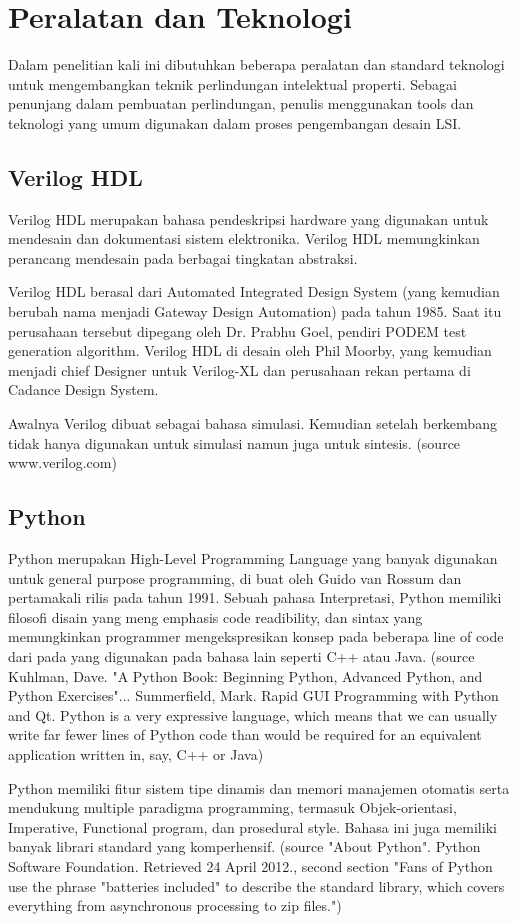 \section{Peralatan dan Teknologi}
Dalam penelitian kali ini dibutuhkan beberapa peralatan dan standard teknologi untuk mengembangkan teknik perlindungan intelektual properti. Sebagai penunjang dalam pembuatan perlindungan, penulis menggunakan tools dan teknologi yang umum digunakan dalam proses pengembangan desain LSI.

\subsection{Verilog HDL}
Verilog HDL merupakan bahasa pendeskripsi hardware yang digunakan untuk mendesain dan dokumentasi sistem elektronika. Verilog HDL memungkinkan perancang mendesain pada berbagai tingkatan abstraksi.

Verilog HDL berasal dari Automated Integrated Design System (yang kemudian berubah nama menjadi Gateway Design Automation) pada tahun 1985. Saat itu perusahaan tersebut dipegang oleh Dr. Prabhu Goel, pendiri PODEM test generation algorithm. Verilog HDL di desain oleh Phil Moorby, yang kemudian menjadi chief Designer untuk Verilog-XL dan perusahaan rekan pertama di Cadance Design System. 

Awalnya Verilog dibuat sebagai bahasa simulasi. Kemudian setelah berkembang tidak hanya digunakan untuk simulasi namun juga untuk sintesis. (source www.verilog.com)

\subsection{Python}
Python merupakan High-Level Programming Language yang banyak digunakan untuk general purpose programming, di buat oleh Guido van Rossum dan pertamakali rilis pada tahun 1991. Sebuah pahasa Interpretasi, Python memiliki filosofi disain yang meng emphasis code readibility, dan sintax yang memungkinkan programmer mengekspresikan konsep pada beberapa line of code dari pada yang digunakan pada bahasa lain seperti C++ atau Java. (source Kuhlman, Dave. "A Python Book: Beginning Python, Advanced Python, and Python Exercises"... Summerfield, Mark. Rapid GUI Programming with Python and Qt. Python is a very expressive language, which means that we can usually write far fewer lines of Python code than would be required for an equivalent application written in, say, C++ or Java)

Python memiliki fitur sistem tipe dinamis dan memori manajemen otomatis serta mendukung multiple paradigma programming, termasuk Objek-orientasi, Imperative, Functional program, dan prosedural style. Bahasa ini juga memiliki banyak librari standard yang komperhensif. (source "About Python". Python Software Foundation. Retrieved 24 April 2012., second section "Fans of Python use the phrase "batteries included" to describe the standard library, which covers everything from asynchronous processing to zip files.")

